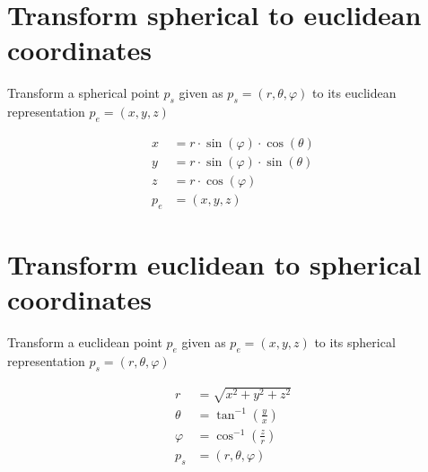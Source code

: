 \documentclass{article}
\begin{document}
\section{Transform spherical to euclidean coordinates}

Transform a spherical point $p_s$ given as $p_s=(r,\theta, \varphi)$ to its euclidean representation $p_e=(x, y, z)$

\begin{align}
    x &= r \cdot \sin(\varphi) \cdot \cos(\theta)\\
    y &= r \cdot \sin(\varphi) \cdot \sin(\theta)\\
    z &= r \cdot \cos(\varphi) \\
    p_e &= (x, y, z)
\end{align}

\section{Transform euclidean to spherical coordinates}

Transform a euclidean point $p_e$ given as $p_e=(x, y, z)$ to its spherical representation $p_s=(r,\theta, \varphi)$

\begin{align}
    r &= \sqrt{x^2 + y^2 + z^2}\\
    \theta &= \tan^{-1}(\frac{y}{x})\\
    \varphi &= \cos^{-1}(\frac{z}{r}) \\
    p_s &= (r, \theta, \varphi)
\end{align}
\end{document}
